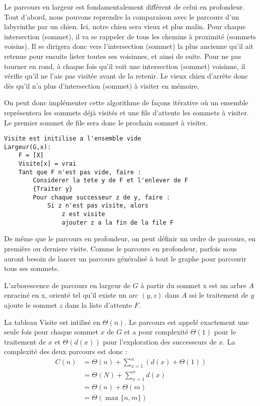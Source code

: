 Le parcours en largeur est fondamentalement différent de celui en profondeur. 
Tout d'abord, nous pouvons reprendre la comparaison avec le parcours d'un labyrinthe par un chien. 
Ici, notre chien sera vieux et plus malin. Pour chaque intersection (sommet), il va se rappeler de tous les chemins
à proximité (sommets voisins). Il se dirigera donc vers l'intersection (sommet) la plus ancienne qu'il ait retenue pour ensuite lister toutes
ses voisinnes, et ainsi de suite.
Pour ne pas tourner en rond, à chaque fois qu'il voit une intersection (sommet) voisinne, il vérifie qu'il ne l'aie pas visitée avant de la retenir.
Le vieux chien d'arrête donc dès qu'il n'a plus d'intersection (sommet) à visiter en mémoire.

On peut donc implémenter cette algorithme de façons itérative où un ensemble représentera les sommets déjà visités
et une file d'attente les sommets à visiter. Le premier sommet de file sera donc le prochain sommet à visiter.

\begin{lstlisting}
Visite est initilise a l'ensemble vide 
Largeur(G,x):
    F = [X]
    Visite[x] = vrai 
    Tant que F n'est pas vide, faire :
        Considerer la tete y de F et l'enlever de F 
        {Traiter y}
        Pour chaque successeur z de y, faire :
            Si z n'est pas visite, alors 
                z est visite 
                ajouter z a la fin de la file F 
\end{lstlisting}

De même que le parcours en profondeur, on peut définir un ordre de parcours, en première ou derniere visite.
Comme le parcours en profondeur, parfois nous auront besoin de lancer un parcours généralisé à tout le graphe pour parcourir tous ses sommets.

\begin{definition}
    L’arborescence de parcours en largeur de $G$ à partir du sommet x est un arbre $A$  enraciné en x, orienté 
    tel qu’il existe un arc $(y,z)$ dans $A$ ssi le traitement de $y$ ajoute le sommet $z$ dans la liste d’attente $F$.
\end{definition}

La tableau Visite est intilisé en $\Theta(n)$. Le parcours est appelé exactement une seule fois pour chaque sommet $x$ de $G$ 
et a pour complexité $\Theta(1)$ pour le traitement de $x$ et $\Theta(d(x))$ pour l'exploration des successeurs de $x$.
La complexité des deux parcours est donc : 
\begin{align*}
    C(n) &= \Theta(n) + \sum_{x=1}^{n} (d(x) + \Theta(1)) \\ 
            &= \Theta(N) +  \sum_{x=1}^{n} d(x) \\
            &= \Theta(n) + \Theta(m) \\
            &= \Theta (\max \{n,m\})
\end{align*}


